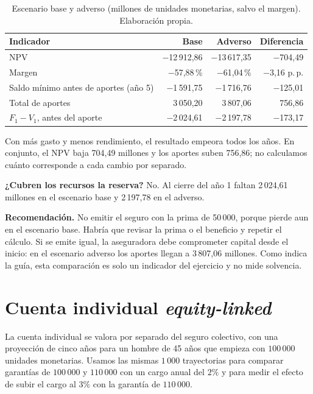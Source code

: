 \documentclass[11pt]{article}
\begin{document}
\begin{table}[htbp]
\centering
\small
\begin{tabular}{lrrr}
\toprule
\textbf{Indicador} & \textbf{Base} & \textbf{Adverso} & \textbf{Diferencia}\\
\midrule
NPV & $-$12\,912,86 & $-$13\,617,35 & $-$704,49 \\
Margen & $-$57,88\,\% & $-$61,04\,\% & $-$3,16 p.\,p. \\
Saldo mínimo antes de aportes (año 5) & $-$1\,591,75 & $-$1\,716,76 & $-$125,01 \\
Total de aportes & 3\,050,20 & 3\,807,06 & 756,86 \\
$F_1 - V_1$, antes del aporte & $-$2\,024,61 & $-$2\,197,78 & $-$173,17 \\
\bottomrule
\end{tabular}
\caption{Escenario base y adverso (millones de unidades monetarias, salvo el margen). Elaboración propia.}
\end{table}

Con más gasto y menos rendimiento, el resultado empeora todos los años. En conjunto, el NPV baja 704,49 millones y los aportes suben 756,86; no calculamos cuánto corresponde a cada cambio por separado.

\textbf{¿Cubren los recursos la reserva?} No. Al cierre del año 1 faltan 2\,024,61 millones en el escenario base y 2\,197,78 en el adverso.

\textbf{Recomendación.} No emitir el seguro con la prima de 50\,000, porque pierde aun en el escenario base. Habría que revisar la prima o el beneficio y repetir el cálculo. Si se emite igual, la aseguradora debe comprometer capital desde el inicio: en el escenario adverso los aportes llegan a 3\,807,06 millones. Como indica la guía, esta comparación es solo un indicador del ejercicio y no mide solvencia.

\section{Cuenta individual \textit{equity-linked}}
\label{sec:equity-linked}

La cuenta individual se valora por separado del seguro colectivo, con una proyección de cinco años para un hombre de 45 años que empieza con $100\,000$ unidades monetarias. Usamos las mismas $1\,000$ trayectorias para comparar garantías de $100\,000$ y $110\,000$ con un cargo anual del $2\%$ y para medir el efecto de subir el cargo al $3\%$ con la garantía de $110\,000$.
\end{document}
